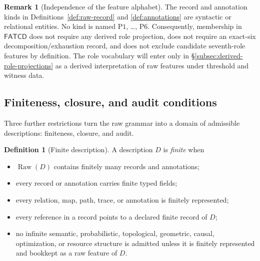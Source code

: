 \documentclass[11pt]{article}
\theoremstyle{definition}
\newtheorem{definition}[theorem]{Definition}
\newtheorem{remark}[theorem]{Remark}
\newcommand{\FATCD}{\ensuremath{\mathsf{FATCD}}}
\newcommand{\Raw}[1]{\ensuremath{\operatorname{Raw}\!\left(#1\right)}}
\newcommand{\Pone}{\ensuremath{\mathrm{P1}}}
\newcommand{\Psix}{\ensuremath{\mathrm{P6}}}
\begin{document}
\begin{remark}[Independence of the feature alphabet]\label{rem:alphabet-independence}
The record and annotation kinds in Definitions~\ref{def:raw-record} and
\ref{def:annotations} are syntactic or relational entities. No kind is named
\Pone{}, \ldots, \Psix{}. Consequently, membership in \FATCD{} does not
require any derived role projection, does not require an exact-six
decomposition/exhaustion record, and does not exclude candidate seventh-role
features by definition. The role vocabulary will enter only in
\S\ref{subsec:derived-role-projections} as a derived interpretation of raw
features under threshold and witness data.
\end{remark}

\subsection{Finiteness, closure, and audit conditions}\label{subsec:conditions}

Three further restrictions turn the raw grammar into a domain of
admissible descriptions: finiteness, closure, and audit.

\begin{definition}[Finite description]\label{def:finite}
A description \(D\) is \emph{finite} when
\begin{itemize}[topsep=2pt,itemsep=1pt]
  \item \(\Raw{D}\) contains finitely many records and annotations;
  \item every record or annotation carries finite typed fields;
  \item every relation, map, path, trace, or annotation is finitely
    represented;
  \item every reference in a record points to a declared finite record of
    \(D\);
  \item no infinite semantic, probabilistic, topological, geometric, causal,
    optimization, or resource structure is admitted unless it is finitely
    represented and bookkept as a raw feature of \(D\).
\end{itemize}
\end{definition}
\end{document}
